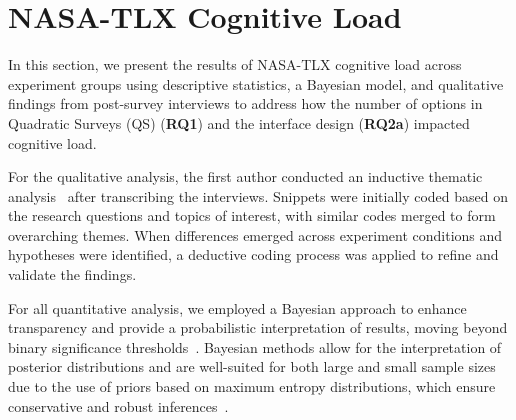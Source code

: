 \section{NASA-TLX Cognitive Load}
In this section, we present the results of NASA-TLX cognitive load across experiment groups using descriptive statistics, a Bayesian model, and qualitative findings from post-survey interviews to address how the number of options in Quadratic Surveys (QS) (\textbf{RQ1}) and the interface design (\textbf{RQ2a}) impacted cognitive load.

For the qualitative analysis, the first author conducted an inductive thematic analysis~\cite{olsonWaysKnowingHCI2014} after transcribing the interviews. Snippets were initially coded based on the research questions and topics of interest, with similar codes merged to form overarching themes. When differences emerged across experiment conditions and hypotheses were identified, a deductive coding process was applied to refine and validate the findings.

For all quantitative analysis, we employed a Bayesian approach to enhance transparency and provide a probabilistic interpretation of results, moving beyond binary significance thresholds~\cite{kay2016researcher}. Bayesian methods allow for the interpretation of posterior distributions and are well-suited for both large and small sample sizes due to the use of priors based on maximum entropy distributions, which ensure conservative and robust inferences~\cite{mcelreath2018statistical}.

